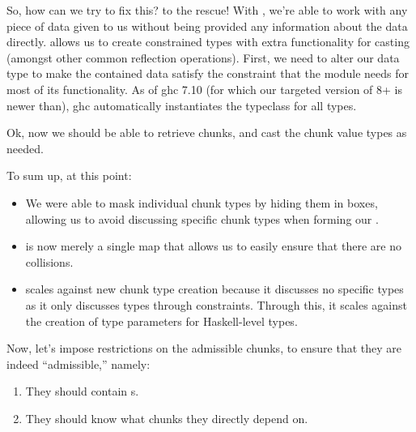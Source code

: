 So, how can we try to fix this?  to the rescue! With
, we're able to work with any piece of data given to us
without being provided any information about the data directly.
 allows us to create constrained types with extra
functionality for casting (amongst other common reflection operations). First,
we need to alter our \Chunk{} data type to make the contained data satisfy the
\Typeable{} constraint that the \Typeable{} module needs for most of its
functionality. As of \acs{ghc} 7.10 (for which our targeted version of 8+ is
newer than), \acs{ghc} automatically instantiates the \Typeable{} typeclass for
all types.

\examinableChunkBox{}

Ok, now we should be able to retrieve chunks, and cast the chunk value types as
needed.

\workingChunkRetriever{}

To sum up, at this point:

\begin{itemize}

      \item We were able to mask individual chunk types by hiding them in
            \Chunk{} boxes, allowing us to avoid discussing specific chunk types
            when forming our \ChunkDB{}.

      \item \ChunkDB{} is now merely a single map that allows us to easily
            ensure that there are no \UID{} collisions.

      \item \ChunkDB{} scales against new chunk type creation because it
            discusses no specific types as it only discusses types through
            constraints. Through this, it scales against the creation of type
            parameters for Haskell-level types.

\end{itemize}

Now, let's impose restrictions on the admissible chunks, to ensure that they are
indeed ``admissible,'' namely:

\begin{enumerate}
      
      \item They should contain \UID{}s.
      
      \item They should know what chunks they directly depend on.

\end{enumerate}

